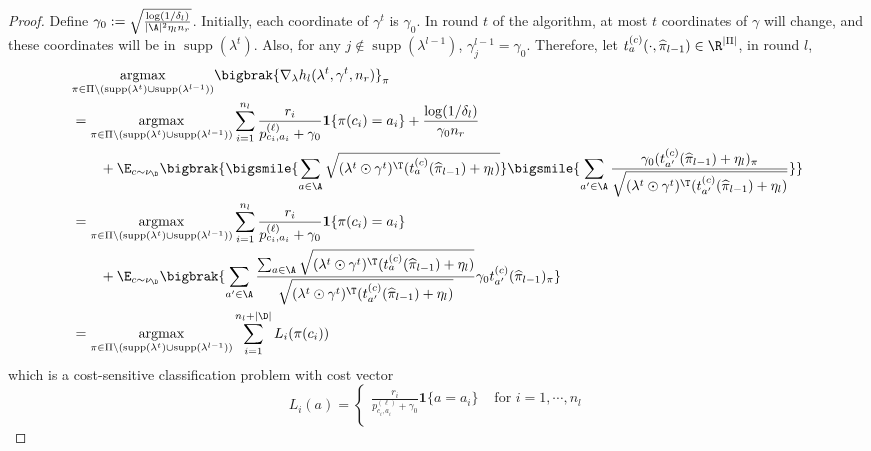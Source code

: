 \documentclass{article}
\newcommand{\pill}{\widehat{\pi}_{l-1}}
\newcommand{\1}{\mathbf{1}}
\newcommand{\supp}{\operatorname{supp}}
\begin{document}
\begin{proof}
Define $\gamma_0:=\sqrt{\frac{\log(1/\delta_l)}{|\A|^2\eta_l n_r}}$. Initially, each coordinate of $\gamma^{t}$ is $\gamma_0$. In round $t$ of the algorithm, at most $t$ coordinates of $\gamma$ will change, and these coordinates will be in $\supp(\lambda^{t})$. Also, for any $j\not\in\supp(\lambda^{l-1})$, $\gamma^{l-1}_j=\gamma_0$.  Therefore, let $t_{a}^{(c)}(\cdot,\pill)\in\R^{|\Pi|}$, in round $l$,  
\begin{align*}
    &\underset{\pi\in\Pi\setminus(\operatorname{supp}(\lambda^{t})\cup \supp(\lambda^{l-1}))}{\operatorname{argmax}}\bigbrak{\nabla_\lambda h_{l}(\lambda^{t},\gamma^{t},n_r)}_\pi\\
    &=\underset{\pi\in\Pi\setminus(\operatorname{supp}(\lambda^{t})\cup \supp(\lambda^{l-1}))}{\operatorname{argmax}} \sum_{i=1}^{n_l}\frac{r_i}{p^{(\ell)}_{c_i,a_i}+\gamma_0}\1\{\pi(c_i)=a_i\}+\frac{\log(1/\delta_l)}{\gamma_0 n_r}\\
    &\qquad+\E_{c\sim\nu_\D}\bigbrak{\bigsmile{\sum_{a\in\A}\sqrt{(\lambda^{t}\odot \gamma^{t})^\T (t_a^{(c)}(\pill)+\eta_l)}}\bigsmile{\sum_{a'\in\A}\frac{\gamma_0(t_{a'}^{(c)}(\pill)+\eta_l)_\pi}{\sqrt{(\lambda^{t}\odot \gamma^{t})^\T (t_{a'}^{(c)}(\pill)+\eta_l)}}}}\\
    &= \underset{\pi\in\Pi\setminus(\operatorname{supp}(\lambda^{t})\cup \supp(\lambda^{l-1}))}{\operatorname{argmax}}\sum_{i=1}^{n_l}\frac{r_i}{p^{(\ell)}_{c_i,a_i}+\gamma_0}\1\{\pi(c_i)=a_i\}\\
    &\qquad+\E_{c\sim\nu_\D}\bigbrak{\sum_{a'\in\A}\frac{\sum_{a\in\A}\sqrt{(\lambda^{t}\odot \gamma^{t})^\T (t_a^{(c)}(\pill)+\eta_l)}}{\sqrt{(\lambda^{t}\odot \gamma^{t})^\T (t_{a'}^{(c)}(\pill)+\eta_l)}}\gamma_0t_{a'}^{(c)}(\pill)_\pi}\\
    &= \underset{\pi\in\Pi\setminus(\operatorname{supp}(\lambda^{t})\cup \supp(\lambda^{l-1}))}{\operatorname{argmax}}\sum_{i=1}^{n_l+|\D|}L_i(\pi(c_i))
\end{align*}
which is a cost-sensitive classification problem with cost vector
\[
L_i(a)=
\begin{cases}
    \frac{r_i}{p^{(\ell)}_{c_i,a_i}+\gamma_0}\1\{a=a_i\} &\textrm{ for }i=1,\cdots,n_l\\

\end{cases}\]
\end{proof}
\end{document}
